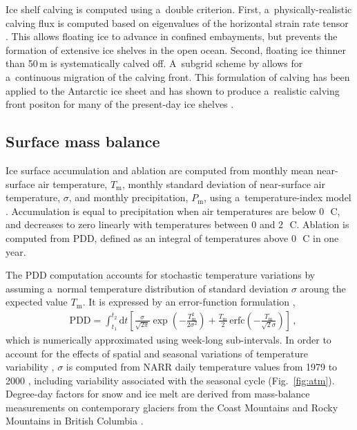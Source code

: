 \documentclass[tc, manuscript]{copernicus}
\begin{document}
      Ice shelf calving is computed using a~double criterion. First,
      a~physically-realistic calving flux is computed based on eigenvalues
      of the horizontal strain rate tensor \citep{Winkelmann.etal.2011,
      Levermann.etal.2012}. This allows floating ice to advance in confined
      embayments, but prevents the formation of extensive ice shelves in the
      open ocean. Second, floating ice thinner than 50\,\unit{m} is
      systematically calved off. A~subgrid scheme by
      \citet{Albrecht.etal.2011} allows for a~continuous migration of the
      calving front. This formulation of calving has been applied to the
      Antarctic ice sheet and has shown to produce a~realistic calving front
      positon for many of the present-day ice shelves
      \citep{Martin.etal.2011}.

\subsection{Surface mass balance}
\label{sec:surface}

      Ice surface accumulation and ablation are computed from monthly mean
      near-surface air temperature, $T_{\mathrm{m}}$, monthly standard
      deviation of near-surface air temperature, $\sigma$, and monthly
      precipitation, $P_{\mathrm{m}}$, using a~temperature-index model
      \citep[e.g.,][]{Hock.2003}. Accumulation is equal to precipitation
      when air temperatures are below 0\,\unit{{\degree}C}, and decreases to
      zero linearly with temperatures between 0 and 2\,\unit{{\degree}C}.
      Ablation is computed from PDD, defined as an integral of temperatures
      above 0\,\unit{{\degree}C} in one year.

      The PDD computation accounts for stochastic temperature variations by
      assuming a~normal temperature distribution of standard deviation
      $\sigma$ aroung the expected value $T_{\mathrm{m}}$. It is expressed
      by an error-function formulation \citep{Calov.Greve.2005},
\begin{align}
&\label{eqn:calovgreve}
    {\text{PDD}} = \int_{t_1}^{t_2} \mathrm{d}t
        \left[\frac{\sigma}{\sqrt{2\pi}}
                \exp\left({-\frac{T_{\mathrm{m}}^2}{2\sigma^2}}\right)
              + \frac{T_{\mathrm{m}}}{2} \, {\text{erfc}}
                \left(-\frac{T_{\mathrm{m}}}{\sqrt{2}\sigma}\right)\right] \,,
\end{align}
      which is numerically approximated using week-long sub-intervals. In
      order to account for the effects of spatial and seasonal variations of
      temperature variability \citep{Seguinot.2013}, $\sigma$ is computed
      from NARR daily temperature values from 1979 to 2000
      \citep{Mesinger.etal.2006}, including variability associated with the
      seasonal cycle (Fig.~\ref{fig:atm}). Degree-day factors for snow and
      ice melt are derived from mass-balance measurements on contemporary
      glaciers from the Coast Mountains and Rocky Mountains in British
      Columbia \citep[Table~\ref{tab:params};][]{Shea.etal.2009}.
\end{document}
